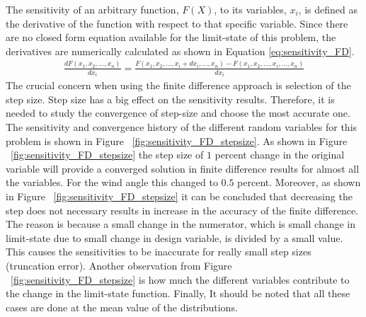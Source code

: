 \documentclass[paper=a4, fontsize=12pt]{scrartcl} %
\begin{document}
The sensitivity of an arbitrary function, $F(X)$, to its variables, $x_i$, is defined as the derivative of the function with respect to that specific variable. Since there are no closed form equation available for the limit-state of this problem, the derivatives are numerically calculated as shown in Equation \eqref{eq:sensitivity_FD}.
%
\begin{gather}\label{eq:sensitivity_FD}
	\frac{dF(x_1,x_2,\dots,x_n)}{dx_i} = \frac{F(x_1,x_2,\dots,x_i + dx_i,\dots,x_n) - F(x_1,x_2,\dots,x_i,\dots,x_n)}{dx_i}
\end{gather}
%
The crucial concern when using the finite difference approach is selection of the step size. Step size has a big effect on the sensitivity results. Therefore, it is needed to study the convergence of step-size and choose the most accurate one. The sensitivity and convergence history of the different random variables for this problem is shown in Figure ~\ref{fig:sensitivity_FD_stepsize}. As shown in Figure ~\ref{fig:sensitivity_FD_stepsize} the step size of $1$ percent change in the original variable will provide a converged solution in finite difference results for almost all the variables. For the wind angle this changed to $0.5$ percent. Moreover, as shown in Figure ~\ref{fig:sensitivity_FD_stepsize} it can be concluded that decreasing the step does not necessary results in increase in the accuracy of the finite difference. The reason is because a small change in the numerator, which is small change in limit-state due to small change in design variable, is divided by a small value. This causes the sensitivities to be inaccurate for really small step sizes (truncation error). Another observation from Figure ~\ref{fig:sensitivity_FD_stepsize} is how much the different variables contribute to the change in the limit-state function. Finally, It should be noted that all these cases are done at the mean value of the distributions.
%
\end{document}
